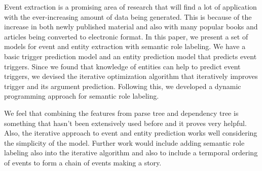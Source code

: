 Event extraction is a promising area of research that will find a lot of application with the ever-increasing amount of data being generated. This is because of the increase in both newly published material and also with many popular books and articles being converted to electronic format. In this paper, we present a set of models for event and entity extraction with semantic role labeling. We have a basic trigger prediction model and an entity prediction model that predicts event triggers. Since we found that knowledge of entities can help to predict event triggers, we devised the iterative optimization algorithm that iteratively improves trigger and its argument prediction. Following this, we developed a dynamic programming approach for semantic role labeling.

We feel that combining the features from parse tree and dependency tree is something that hasn't been extensively used before and it proves very helpful. Also, the iterative approach to event and entity prediction works well considering the simplicity of the model. Further work would include adding semantic role labeling also into the iterative algorithm and also to include a termporal ordering of events to form a chain of events making a story.